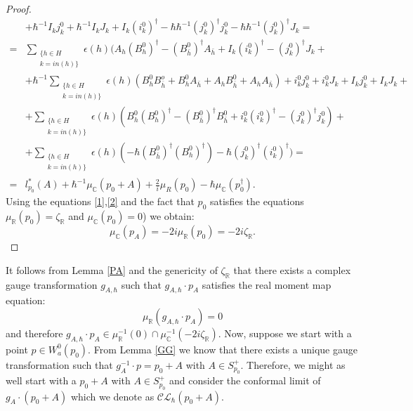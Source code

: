 \documentclass[12pt,oneside,reqno]{amsart}
\theoremstyle{definition}
\numberwithin{equation}{section}
\numberwithin{theorem}{section}
\newcommand{\R}{\mathbb{R}}
\newcommand{\C}{\mathbb{C}}
\renewcommand{\d}[1]{\ensuremath{\operatorname{d}\!{#1}}}
\renewcommand{\d}{\dagger}
\newcommand{\hb}{\bar{h}}
\begin{document}
\begin{proof}
\begin{equation*}
\begin{split}
    &+ \hbar^{-1}I_kj_k^0+\hbar^{-1}I_kJ_k +I_k(i_k^0)^\d -\hbar \hbar^{-1}(j_k^0)^\d j_k^0 -\hbar \hbar^{-1} (j_k^0)^\d J_k= \\
    =&\sum\limits_{\substack{\{h\in H\\k=in(h)\}}} \epsilon(h)(A_h (B_h^0)^\d -(B_{\hb}^0)^\d A_{\hb}+I_k(i_k^0)^\d -(j_k^0)^\d J_k+ \\
    &+ \hbar^{-1} \sum\limits_{\substack{\{h\in H\\k=in(h)\}}} \epsilon(h) (B_h^0B_{\hb}^o+ B_h^0A_{\hb}+A_h B_{\hb}^0+A_h A_{\hb})+i_k^0j_k^0+i_k^0J_k+I_kj_k^0+I_kJ_k+ \\
    &+\sum\limits_{\substack{\{h\in H\\k=in(h)\}}}\epsilon(h)(B_h^0(B_h^0)^\d -(B_{\hb}^0)^\d B_{\hb}^0 +i_k^0(i_k^0)^\d -(j_k^0)^\d j_k^0) +\\
    &+\sum\limits_{\substack{\{h\in H\\k=in(h)\}}} \epsilon(h)(-\hbar (B_{\hb}^0)^\d (B_h^0)^\d)-\hbar (j_k^0)^\d(i_k^0)^\d) = \\
    =& l_{p_0}^*(A)+\hbar ^{-1}\mu_\C(p_0+A)+\frac{2}{i}\mu_R(p_0)-\hbar \mu_\C(p_0^\d).
\end{split}
\end{equation*}
Using the equations \eqref{1},\eqref{2} and the fact that $p_0$ satisfies the equations $\mu _\R(p_0)=\zeta_{\R}$ and $\mu_\C(p_0)=0$) we obtain:
%
\begin{equation*}
    \mu_\C(p_A)=-2i\mu_\R(p_0)=-2i\zeta_\R.
\end{equation*}
\end{proof}
%
It follows from Lemma \ref{PA} and the genericity of $\zeta_{\R}$ that there exists a complex gauge transformation $g_{A,\hbar}$ such that 
$g_{A,\hbar}\cdot p_A$ satisfies the real moment map equation: 
%
\begin{equation}\label{pa}
    \mu_{\R}(g_{A,\hbar}\cdot p_A) = 0
\end{equation}
%
and therefore $g_{A,\hbar}\cdot p_A\in \mu^{-1}_{\R}(0)\cap\mu^{-1}_{\C}(-2i\zeta_{\R})$. 
Now, suppose we start with a point $p\in W_a^0(p_0)$. From Lemma \ref{GG} we know that there exists a unique gauge transformation such that $g_A^{-1}\cdot p = p_0+A$ with $A\in S^+_{p_0}$. Therefore, we might as well start with a $p_0+A$ with $A\in S^+_{p_0}$ and consider the conformal limit of $g_A\cdot(p_0+A)$ which we denote as $\mathcal {CL}_{\hbar}(p_0+A)$. 
\end{document}
